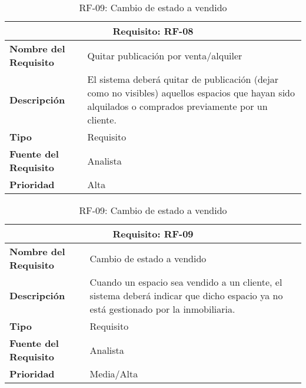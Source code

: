 \begin{table}[H]
\begin{table}[H]
\begin{center}
\begin{tabular}{p{} p{7cm}}
\multicolumn{2}{c}{\textbf{Requisito: RF-08} } \\
\hline \hline
\textbf{Nombre del Requisito} & Quitar publicación por venta/alquiler  \\
\hline
\textbf{Descripción} & El sistema deberá quitar de publicación (dejar como no visibles) aquellos espacios que hayan sido alquilados o comprados previamente por un cliente.\\
\hline
\textbf{Tipo} & Requisito  \\
\hline
\textbf{Fuente del Requisito} &  Analista \\
\hline
\textbf{Prioridad} & Alta  \\ \hline
\end{tabular}
\caption{RF-08: Quitar publicación por venta/alquiler}
\label{tab:RF-08}
\end{center}
\end{table}

\begin{table}[H]
\begin{center}
\begin{tabular}{p{} p{7cm}}
\multicolumn{2}{c}{\textbf{Requisito: RF-09} } \\
\hline \hline
\textbf{Nombre del Requisito} &  Cambio de estado a vendido \\
\hline
\textbf{Descripción} & Cuando un espacio sea vendido a un cliente, el sistema deberá indicar que dicho espacio ya no está gestionado por la inmobiliaria.\\
\hline
\textbf{Tipo} & Requisito  \\
\hline
\textbf{Fuente del Requisito} & Analista \\
\hline
\textbf{Prioridad} &  Media/Alta \\ \hline
\end{tabular}
\caption{RF-09: Cambio de estado a vendido}
\label{tab:RF-09}
\end{center}
\end{table}


\end{table}
